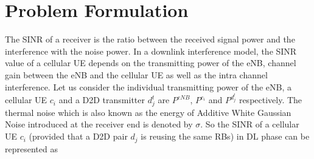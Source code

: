 \documentclass[times]{dacauth}
\begin{document}
		  
	
	







\section{Problem Formulation}\label{section:Problem Formulation}
\vspace {-0.3cm}
\noindent
The SINR of a receiver is the ratio between the received signal power and the interference with the noise power. In a downlink interference model, the SINR value of a cellular UE depends on the transmitting power of the eNB, channel gain between the eNB and the cellular UE as well as the intra channel interference. Let us consider the individual transmitting power of the eNB, a cellular UE $c_i$ and a D2D transmitter $d_j^t$ are $P^{eNB}$, $P^{c_i}$ and $P^{d_j^t}$ respectively. The thermal noise which is also known as the energy of Additive White Gaussian Noise introduced at the receiver end is denoted by $\sigma$. So the SINR of a cellular UE $c_i$ (provided that a D2D pair $d_j$ is reusing the same RBs) in DL phase \cite{zulhasnine} can be represented as
\end{document}
